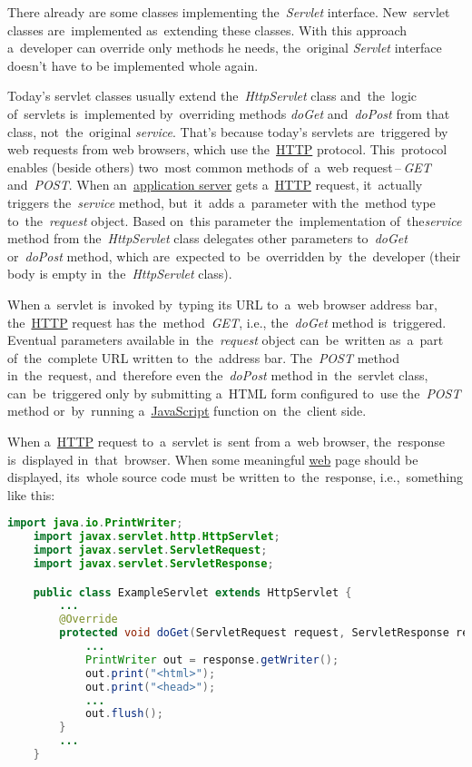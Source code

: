 There already are some classes implementing the~\textit{Servlet} interface. New~servlet classes are~implemented as~extending these classes. With this approach a~developer can override only methods he needs, the~original \textit{Servlet} interface doesn't have to be implemented whole again.

 Today's servlet classes usually extend the~\textit{HttpServlet} class and~the~logic of~servlets is~implemented by~overriding methods \textit{doGet} and~\textit{doPost} from that class, not~the~original \textit{service}. That's because today's servlets are~triggered by web requests from web browsers, which use the~\hyperref[http]{HTTP} protocol. This~protocol enables (beside others) two~most common methods of~a~web request\,--\,\textit{GET} and~\textit{POST}. When an~\hyperref[applicationserver]{application server} gets a~\hyperref[http]{HTTP} request, it~actually triggers the~\textit{service} method, but~it~adds a~parameter with the~method type to~the~\textit{request} object. Based on~this parameter the~implementation of~the\textit{service} method from the~\textit{HttpServlet} class delegates other parameters to~\textit{doGet} or~\textit{doPost} method, which are~expected to~be~overridden by~the~developer (their body is empty in~the~\textit{HttpServlet} class).

When a~servlet is~invoked by~typing its URL to~a~web browser address bar, the~\hyperref[http]{HTTP} request has the~method~\textit{GET}, i.e., the~\textit{doGet} method is~triggered. Eventual parameters available in~the~\textit{request} object can~be~written as~a~part of~the~complete URL written to~the~address bar. The~\textit{POST} method in~the~request, and~therefore even the~\textit{doPost} method in~the~servlet class, can~be~triggered only by submitting a~HTML form configured to~use the~\textit{POST} method or~by~running a~\hyperref[javascript]{JavaScript} function on~the~client side.


\label{jsp}
When a~\hyperref[http]{HTTP} request to~a~servlet is~sent from a~web browser, the~response is~displayed in~that~browser. When some meaningful \hyperref[internetweb]{web} page should be displayed, its~whole source code must be written to~the~response, i.e.,~something like this:

\begin{lstlisting}[language=Java]
    import java.io.PrintWriter;
    import javax.servlet.http.HttpServlet;
    import javax.servlet.ServletRequest;
    import javax.servlet.ServletResponse;

    public class ExampleServlet extends HttpServlet {
        ...
        @Override
        protected void doGet(ServletRequest request, ServletResponse response) {
            ...
            PrintWriter out = response.getWriter();
            out.print("<html>");
            out.print("<head>");
            ...
            out.flush();
        }
        ...
    }
\end{lstlisting}

